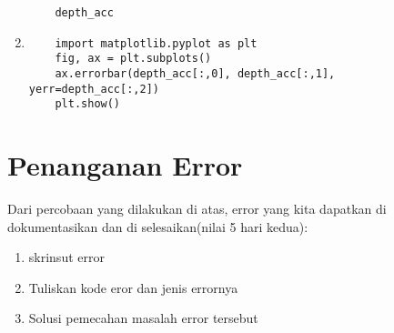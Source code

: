\begin{enumerate}
\begin{verbatim}
	depth_acc
\end{verbatim}
\item 
\begin{verbatim}
	import matplotlib.pyplot as plt
	fig, ax = plt.subplots()
	ax.errorbar(depth_acc[:,0], depth_acc[:,1], yerr=depth_acc[:,2])
	plt.show()
\end{verbatim}

\end{enumerate}


\section{Penanganan Error}
Dari percobaan yang dilakukan di atas, error yang kita dapatkan di dokumentasikan dan di selesaikan(nilai 5 hari kedua):

\begin{enumerate}
	\item
skrinsut error
	\item
Tuliskan kode eror dan jenis errornya
	\item
Solusi pemecahan masalah error tersebut

\end{enumerate}

